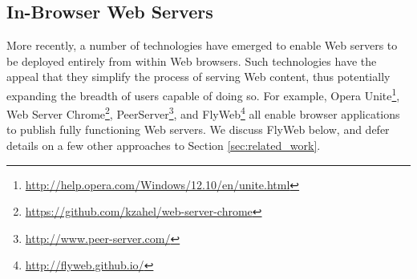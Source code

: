 \subsection{In-Browser Web Servers}
\label{sub:background_in_browser_web_servers}

More recently, a number of technologies have emerged to enable Web servers to be deployed entirely from within Web browsers.
Such technologies have the appeal that they simplify the process of serving Web content, thus potentially expanding the breadth of users capable of doing so.
For example, Opera Unite\footnote{\url{http://help.opera.com/Windows/12.10/en/unite.html}}, Web Server Chrome\footnote{\url{https://github.com/kzahel/web-server-chrome}}, PeerServer\footnote{\url{http://www.peer-server.com/}}, and FlyWeb\footnote{\url{http://flyweb.github.io/}} all enable browser applications to publish fully functioning Web servers.
We discuss FlyWeb below, and defer details on a few other approaches to Section \ref{sec:related_work}.